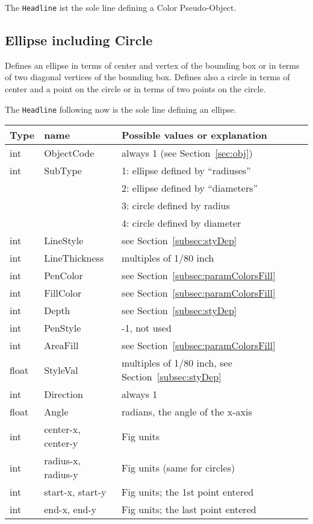 \documentclass[10pt, a4paper]{article}
\begin{document}
The \texttt{Headline} ist the sole line defining a Color Pseudo-Object. 


\subsection{Ellipse including Circle}\label{subsec:ellipse}

Defines an ellipse in terms of center and vertex of the bounding box 
or in terms of two diagonal vertices of the bounding box. 
Defines also a circle in terms of center and a point on the circle 
or in terms of two points on the circle. 

\noindent
The \texttt{Headline} following now is the sole line defining an ellipse. \\
%
\begin{tabular}{lll}
\toprule
Type  & name                & Possible values or explanation \\
\midrule
\midrule
int   &  ObjectCode         & always 1 (see Section~\ref{sec:obj}) \\
int   &  SubType            & 1: ellipse defined by ``radiuses'' \\
&&                            2: ellipse defined by ``diameters'' \\
&&                            3: circle defined by radius \\
&&                            4: circle defined by diameter \\
int   &  LineStyle          & see Section~\ref{subsec:styDep} \\
int   &  LineThickness      & multiples of 1/80 inch \\
int   &  PenColor           & see Section~\ref{subsec:paramColorsFill} \\
int   &  FillColor          & see Section~\ref{subsec:paramColorsFill} \\
int   &  Depth              & see Section~\ref{subsec:styDep} \\
int   &  PenStyle           & -1, not used \\
int   &  AreaFill           & see Section~\ref{subsec:paramColorsFill} \\
float &  StyleVal           & multiples of 1/80 inch, 
                              see Section~\ref{subsec:styDep}  \\
int   &  Direction          & always 1 \\
float &  Angle              & radians, the angle of the x-axis \\
int   &  center-x, center-y & Fig units \\
int   &  radius-x, radius-y & Fig units (same for circles) \\
int   &  start-x, start-y   & Fig units; the 1st point entered \\
int   &  end-x, end-y       & Fig units; the last point entered \\
\bottomrule
\end{tabular}
\end{document}
